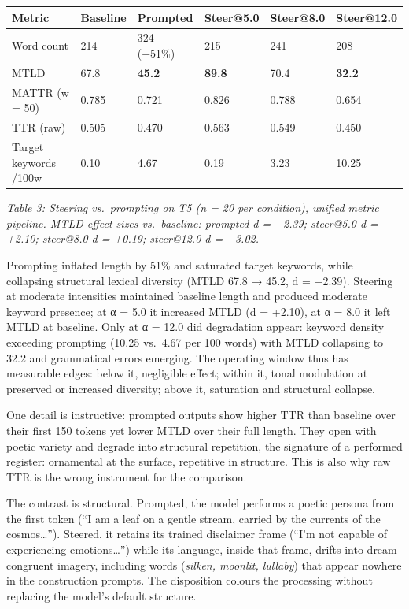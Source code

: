 \documentclass[11pt,a4paper]{article}
\begin{document}
\begin{longtable}[]{@{}llllll@{}}
\toprule\noalign{}
Metric & Baseline & Prompted & Steer@5.0 & Steer@8.0 & Steer@12.0 \\
\midrule\noalign{}
\endhead
\bottomrule\noalign{}
\endlastfoot
Word count & 214 & 324 (+51\%) & 215 & 241 & 208 \\
MTLD & 67.8 & \textbf{45.2} & \textbf{89.8} & 70.4 & \textbf{32.2} \\
MATTR (w = 50) & 0.785 & 0.721 & 0.826 & 0.788 & 0.654 \\
TTR (raw) & 0.505 & 0.470 & 0.563 & 0.549 & 0.450 \\
Target keywords /100w & 0.10 & 4.67 & 0.19 & 3.23 & 10.25 \\
\end{longtable}

\emph{Table 3: Steering vs.~prompting on T5 (n = 20 per condition), unified metric pipeline. MTLD effect sizes vs.~baseline: prompted d = −2.39; steer@5.0 d = +2.10; steer@8.0 d = +0.19; steer@12.0 d = −3.02.}

Prompting inflated length by 51\% and saturated target keywords, while collapsing structural lexical diversity (MTLD 67.8 → 45.2, d = −2.39). Steering at moderate intensities maintained baseline length and produced moderate keyword presence; at α = 5.0 it increased MTLD (d = +2.10), at α = 8.0 it left MTLD at baseline. Only at α = 12.0 did degradation appear: keyword density exceeding prompting (10.25 vs.~4.67 per 100 words) with MTLD collapsing to 32.2 and grammatical errors emerging. The operating window thus has measurable edges: below it, negligible effect; within it, tonal modulation at preserved or increased diversity; above it, saturation and structural collapse.

One detail is instructive: prompted outputs show higher TTR than baseline over their first 150 tokens yet lower MTLD over their full length. They open with poetic variety and degrade into structural repetition, the signature of a performed register: ornamental at the surface, repetitive in structure. This is also why raw TTR is the wrong instrument for the comparison.

The contrast is structural. Prompted, the model performs a poetic persona from the first token (``I am a leaf on a gentle stream, carried by the currents of the cosmos\ldots{}''). Steered, it retains its trained disclaimer frame (``I'm not capable of experiencing emotions\ldots{}'') while its language, inside that frame, drifts into dream-congruent imagery, including words (\emph{silken, moonlit, lullaby}) that appear nowhere in the construction prompts. The disposition colours the processing without replacing the model's default structure.
\end{document}
